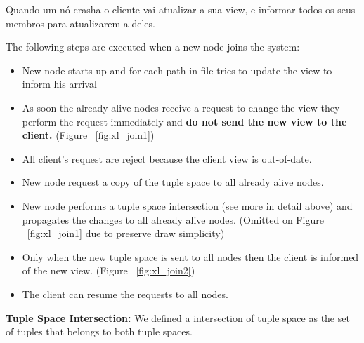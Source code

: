 \documentclass[times, 10pt,twocolumn]{article}
\begin{document}
Quando um nó crasha o cliente vai atualizar a sua view, e informar todos os seus membros
para atualizarem a deles.



The following steps are executed when a new node joins the system:
\begin{itemize}
   \item New node starts up and for each path in file tries to update the view to inform his arrival
   \item As soon the already alive nodes receive a request to change the view they perform the request
   immediately and \textbf{do not send the new view to the client.} (Figure ~\ref{fig:xl_join1})
   \item All client's request are reject because the client view is out-of-date.
   \item New node request a copy of the tuple space to all already alive nodes.
   \item New node performs a tuple space intersection (see more in detail above) and propagates the changes
   to all already alive nodes. (Omitted on Figure ~\ref{fig:xl_join1} due to preserve draw simplicity)
   \item Only when the new tuple space is sent to all nodes then the client is informed of the new view. (Figure ~\ref{fig:xl_join2})
   \item The client can resume the requests to all nodes.   
\end{itemize}

\textbf{Tuple Space Intersection:} We defined a intersection of tuple space as the set of tuples
that belongs to both tuple spaces.
\end{document}
